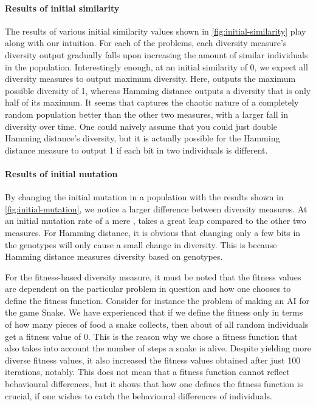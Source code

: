 \paragraph{Results of initial similarity} The results of various initial similarity values shown in \cref{fig:initial-similarity} play along with our intuition. For each of the problems, each diversity measure's diversity output gradually falls upon increasing the amount of similar individuals in the population. Interestingly enough, at an initial similarity of 0, we expect all diversity measures to output maximum diversity. Here, \dia{} outputs the maximum possible diversity of 1, whereas Hamming distance outputs a diversity that is only half of its maximum. It seems that \dia{} captures the chaotic nature of a completely random population better than the other two measures, with a larger fall in diversity over time. One could naively assume that you could just double Hamming distance's diversity, but it is actually possible for the Hamming distance measure to output 1 if each bit in two individuals is different.
%

%
\paragraph{Results of initial mutation} By changing the initial mutation in a population with the results shown in \cref{fig:initial-mutation}, we notice a larger difference between diversity measures. At an initial mutation rate of a mere , \dia{} takes a great leap compared to the other two measures. For Hamming distance, it is obvious that changing only a few bits in the genotypes will only cause a small change in diversity. This is because Hamming distance measures diversity based on genotypes.

For the fitness-based diversity measure, it must be noted that the fitness values are dependent on the particular problem in question and how one chooses to define the fitness function. Consider for instance the problem of making an AI for the game Snake. We have experienced that if we define the fitness only in terms of how many pieces of food a snake collects, then about  of all random individuals get a fitness value of 0. This is the reason why we chose a fitness function that also takes into account the number of steps a snake is alive. Despite yielding more diverse fitness values, it also increased the fitness values obtained after just 100 iterations, notably. This does not mean that a fitness function cannot reflect behavioural differences, but it shows that how one defines the fitness function is crucial, if one wishes to catch the behavioural differences of individuals.
%


